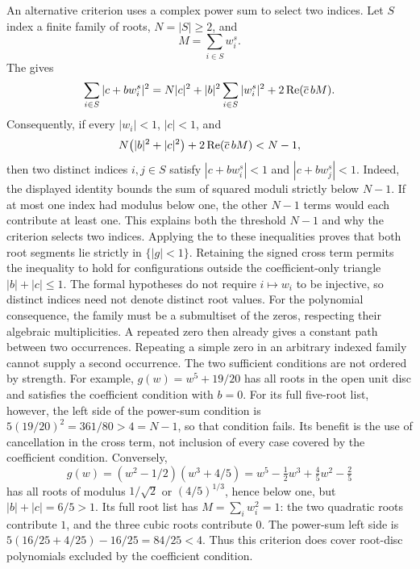 An alternative criterion uses a complex power sum to select two
indices. Let $S$ index a finite family of roots, $N=|S|\ge2$, and
\[
  M=\sum_{i\in S}w_i^s.
\]
The  gives
\[
 \sum_{i\in S}|c+bw_i^s|^2
 =N|c|^2+|b|^2\sum_{i\in S}|w_i^s|^2
   +2\mathop{\rm Re}(\overline c\,bM).
\]
Consequently, if every $|w_i|<1$, $|c|<1$, and
\[
 N\bigl(|b|^2+|c|^2\bigr)
   +2\mathop{\rm Re}(\overline c\,bM)<N-1,
\]
then two distinct indices $i,j\in S$ satisfy
$|c+bw_i^s|<1$ and $|c+bw_j^s|<1$. Indeed, the displayed identity
bounds the sum of squared moduli strictly below $N-1$. If at most one
index had modulus below one, the other $N-1$ terms would each contribute
at least one. This explains both the threshold $N-1$ and why the
criterion selects two indices. Applying the
 to these inequalities proves that both root segments lie
strictly in $\{|g|<1\}$.  Retaining the signed cross term permits the inequality to hold for configurations outside the coefficient-only triangle
$|b|+|c|\le1$.  The formal hypotheses do not require $i\mapsto w_i$ to be
injective, so distinct indices need not denote distinct root values.
For the polynomial consequence, the family must be a submultiset of the
zeros, respecting their algebraic multiplicities. A repeated zero then
already gives a constant path between two occurrences. Repeating a simple
zero in an arbitrary indexed family cannot supply a second occurrence.
The two sufficient conditions are not ordered by strength. For example,
$g(w)=w^5+19/20$ has all roots in the open unit disc and satisfies the
coefficient condition with $b=0$. For its full five-root list, however,
the left side of the power-sum condition is
$5(19/20)^2=361/80>4=N-1$, so that condition fails. Its benefit is the
use of cancellation in the cross term, not inclusion of every case
covered by the coefficient condition. Conversely,
\[
 g(w)=(w^2-1/2)(w^3+4/5)
     =w^5-\tfrac12w^3+\tfrac45w^2-\tfrac25
\]
has all roots of modulus $1/\sqrt2$ or $(4/5)^{1/3}$, hence below
one, but $|b|+|c|=6/5>1$. Its full root list has
$M=\sum_iw_i^2=1$: the two quadratic roots contribute $1$, and the
three cubic roots contribute $0$. The power-sum left side is
$5(16/25+4/25)-16/25=84/25<4$. Thus this criterion does cover
root-disc polynomials excluded by the coefficient condition.

